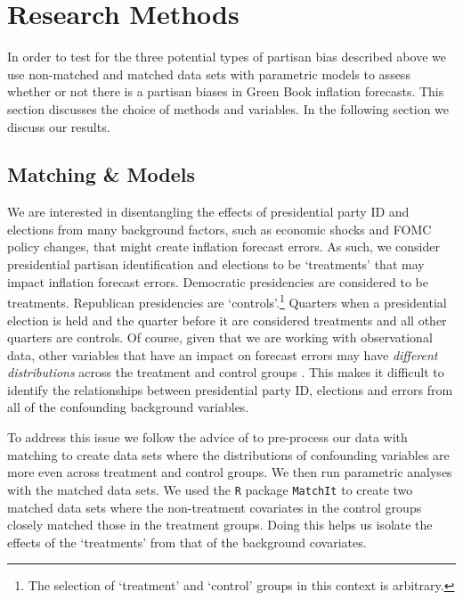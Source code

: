 \documentclass[a4paper]{article}
\begin{document}

\section{Research Methods}

In order to test for the three potential types of partisan bias described above we use non-matched and matched data sets with parametric models \citep[see][]{Ho2007} to assess whether or not there is a partisan biases in Green Book inflation forecasts. This section discusses the choice of methods and variables. In the following section we discuss our results.

\subsection{Matching \& Models}

We are interested in disentangling the effects of presidential party ID and elections from many background factors, such as economic shocks and FOMC policy changes, that might create inflation forecast errors. As such, we consider presidential partisan identification and elections to be `treatments' that may impact inflation forecast errors. Democratic presidencies are considered to be treatments. Republican presidencies are `controls'.\footnote{The selection of `treatment' and `control' groups in this context is arbitrary.} Quarters when a presidential election is held and the quarter before it are considered treatments and all other quarters are controls. Of course, given that we are working with observational data, other variables that have an impact on forecast errors may have {\emph{different distributions}} across the treatment and control groups \citep{Cochran1973, Diamond2012}. This makes it difficult to identify the relationships between presidential party ID, elections and errors from all of the confounding background variables.

To address this issue we follow the advice of \cite{Ho2007} to pre-process our data with matching to create data sets where the distributions of confounding variables are more even across treatment and control groups. We then run parametric analyses with the matched data sets. We used the {\tt{R}} package {\tt{MatchIt}} \citep{matchit2011} to create two matched data sets where the non-treatment covariates in the control groups closely matched those in the treatment groups. Doing this helps us isolate the effects of the `treatments' from that of the background covariates.
\end{document}
